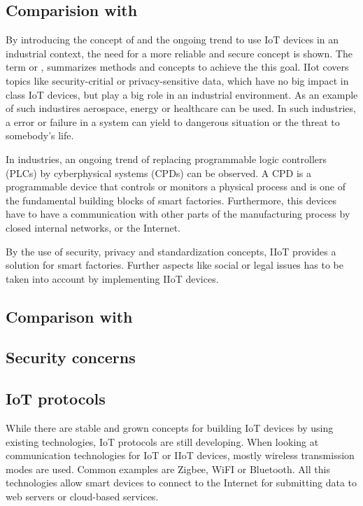 \subsection{Comparision with }
By introducing the concept of  and the ongoing trend to use IoT devices in an industrial context, the need for a more reliable and secure concept is shown. The term  or , summarizes methods and concepts to achieve the this goal. IIot covers topics like security-critial or privacy-sensitive data, which have no big impact in class IoT devices, but play a big role in an industrial environment\cite{iiot}. As an example of such industires aerospace, energy or healthcare can be used. In such industries, a error or failure in a system can yield to dangerous situation or the threat to somebody's life\cite{iiot2}.

In industries, an ongoing trend of replacing programmable logic controllers (PLCs) by cyberphysical systems (CPDs) can be observed. A CPD is a programmable device that controls or monitors a physical process and is one of the fundamental building blocks of smart factories. Furthermore, this devices have to have a communication with other parts of the manufacturing process by closed internal networks, or the Internet\cite{iiot}.

By the use of security, privacy and standardization concepts, IIoT provides a solution for smart factories. Further aspects like social or legal issues has to be taken into account by implementing IIoT devices\cite{iiot}.

\subsection{Comparison with }

\subsection{Security concerns}

\subsection{IoT protocols}
While there are stable and grown concepts for building IoT devices by using existing technologies, IoT protocols are still developing. When looking at communication technologies for IoT or IIoT devices, mostly wireless transmission modes are used. Common examples are Zigbee, WiFI or Bluetooth. All this technologies allow smart devices to connect to the Internet for submitting data to web servers or cloud-based services\cite{iotprotocols}.

